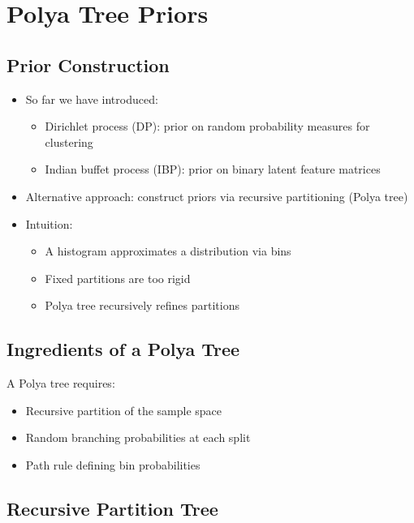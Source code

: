 \documentclass[12pt,oneside]{book}
\numberwithin{equation}{section}
\theoremstyle{definition}
\theoremstyle{plain}
\theoremstyle{remark}
\begin{document}
\chapter{Polya Tree Priors}

\section{Prior Construction}

\begin{itemize}
\item So far we have introduced:
\begin{itemize}
\item Dirichlet process (DP): prior on random probability measures for clustering
\item Indian buffet process (IBP): prior on binary latent feature matrices
\end{itemize}

\item Alternative approach: construct priors via recursive partitioning (Polya tree)

\item Intuition:
\begin{itemize}
\item A histogram approximates a distribution via bins
\item Fixed partitions are too rigid
\item Polya tree recursively refines partitions
\end{itemize}
\end{itemize}

\section{Ingredients of a Polya Tree}

A Polya tree requires:

\begin{itemize}
\item Recursive partition of the sample space
\item Random branching probabilities at each split
\item Path rule defining bin probabilities
\end{itemize}

\section{Recursive Partition Tree}
\end{document}
